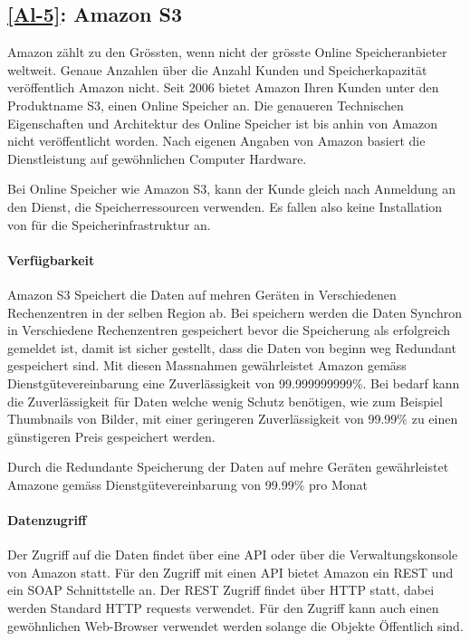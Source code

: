 \subsection{\ref{Al-5}: Amazon S3}
Amazon zählt zu den Grössten, wenn nicht der grösste Online Speicheranbieter weltweit. Genaue Anzahlen über die Anzahl Kunden und Speicherkapazität veröffentlich Amazon nicht. Seit 2006 bietet Amazon Ihren Kunden unter den Produktname S3, einen Online Speicher an. Die genaueren Technischen Eigenschaften und Architektur des Online Speicher ist bis anhin von Amazon nicht veröffentlicht worden. Nach eigenen Angaben von Amazon basiert die Dienstleistung auf gewöhnlichen Computer Hardware.






Bei Online Speicher wie Amazon S3, kann der Kunde gleich nach Anmeldung an den Dienst, die Speicherressourcen verwenden. Es fallen also keine Installation von für
die Speicherinfrastruktur an. 

\paragraph*{Verfügbarkeit}
Amazon S3 Speichert die Daten auf mehren Geräten in Verschiedenen Rechenzentren in der selben Region ab. Bei speichern werden die Daten Synchron in Verschiedene Rechenzentren gespeichert bevor die Speicherung als erfolgreich gemeldet ist, damit ist sicher gestellt, dass die Daten von beginn weg Redundant gespeichert sind. Mit diesen Massnahmen gewährleistet Amazon gemäss Dienstgütevereinbarung eine Zuverlässigkeit von 99.999999999\%. Bei bedarf kann die Zuverlässigkeit für Daten welche wenig Schutz benötigen, wie zum Beispiel Thumbnails von Bilder, mit einer geringeren Zuverlässigkeit von 99.99\% zu einen günstigeren Preis gespeichert werden.\cite{Amazon2007}

Durch die Redundante Speicherung der Daten auf mehre Geräten gewährleistet Amazone gemäss Dienstgütevereinbarung von 99.99\% pro Monat

\paragraph*{Datenzugriff}
Der Zugriff auf die Daten findet über eine API oder über die Verwaltungskonsole von Amazon statt. Für den Zugriff mit einen API bietet Amazon ein \gls{REST} und ein \gls{SOAP} Schnittstelle an. Der \gls{REST} Zugriff findet über HTTP statt, dabei werden Standard HTTP requests verwendet. Für den Zugriff kann auch einen gewöhnlichen Web-Browser verwendet werden solange die Objekte Öffentlich sind.

